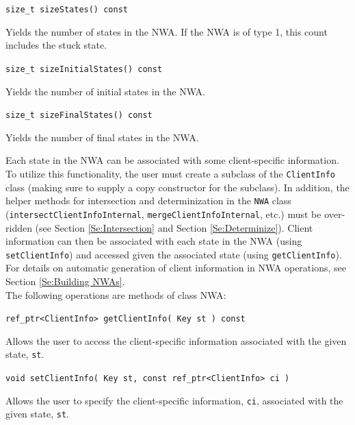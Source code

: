 \documentclass{llncs}
\begin{document}
\begin{description}
  \item\texttt{size\_t sizeStates() const} \nopagebreak

    Yields the number of states in the NWA.  If the NWA is of type 1, this
    count includes the stuck state.

  \item\texttt{size\_t sizeInitialStates() const} \nopagebreak

    Yields the number of initial states in the NWA.

  \item\texttt{size\_t sizeFinalStates() const} \nopagebreak

    Yields the number of final states in the NWA. \\

\end{description}

Each state in the NWA can be associated with some client-specific
information. To utilize this functionality, the user must create a subclass
of the \texttt{ClientInfo} class (making sure to supply a copy constructor
for the subclass).  In addition, the helper methods for intersection and
determinization in the \texttt{NWA} class
(\texttt{intersectClientInfoInternal}, \texttt{mergeClientInfoInternal},
etc.) must be over-ridden (see Section \ref{Se:Intersection} and Section
\ref{Se:Determinize}).  Client information can then be associated with each
state in the NWA (using \texttt{setClientInfo}) and accessed given the
associated state (using \texttt{getClientInfo}).  For details on automatic
generation of client information in NWA operations, see Section
\ref{Se:Building NWAs}. \\

\noindent The following operations are methods of class NWA:

\begin{description}

  \item\texttt{ref\_ptr<ClientInfo> getClientInfo( Key st ) const} \nopagebreak

    Allows the user to access the client-specific information associated with
    the given state, \texttt{st}.

  \item\texttt{void setClientInfo( Key st, const ref\_ptr<ClientInfo> ci )} \nopagebreak

    Allows the user to specify the client-specific information, \texttt{ci},
    associated with the given state, \texttt{st}. \\

\end{description}
\end{document}
